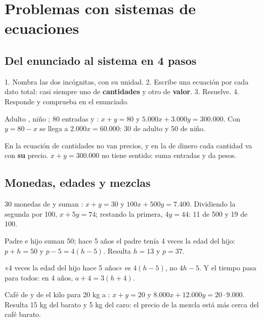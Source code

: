 \section{Problemas con sistemas de ecuaciones}

\subsection{Del enunciado al sistema en 4 pasos}
\begin{clave} 1. Nombra las dos incógnitas, con su unidad. 2. Escribe una ecuación por cada dato total: casi siempre uno de \textbf{cantidades} y otro de \textbf{valor}. 3. Resuelve. 4. Responde y comprueba en el enunciado.\end{clave}
\begin{ejemplo}[Entradas] Adulto , niño ; 80 entradas y : $x + y = 80$ y $5.000x + 3.000y = 300.000$. Con $y = 80 - x$ se llega a $2.000x = 60.000$: 30 de adulto y 50 de niño.\end{ejemplo}
\begin{ojo}[No mezcles] En la ecuación de cantidades no van precios, y en la de dinero cada cantidad va con \textbf{su} precio. $x + y = 300.000$ no tiene sentido: suma entradas y da pesos.\end{ojo}

\subsection{Monedas, edades y mezclas}
\begin{ejemplo}[Monedas] 30 monedas de  y  suman : $x + y = 30$ y $100x + 500y = 7.400$. Dividiendo la segunda por 100, $x + 5y = 74$; restando la primera, $4y = 44$: 11 de 500 y 19 de 100.\end{ejemplo}
\begin{ejemplo}[Edades] Padre e hijo suman 50; hace 5 años el padre tenía 4 veces la edad del hijo: $p + h = 50$ y $p - 5 = 4(h - 5)$. Resulta $h = 13$ y $p = 37$.\end{ejemplo}
\begin{ojo} «4 veces la edad del hijo hace 5 años» es $4(h - 5)$, no $4h - 5$. Y el tiempo pasa para todos: en 4 años, $a + 4 = 3(h + 4)$.\end{ojo}
\begin{ejemplo}[Mezclas] Café de  y de  el kilo para 20 kg a : $x + y = 20$ y $8.000x + 12.000y = 20\cdot 9.000$. Resulta 15 kg del barato y 5 kg del caro: el precio de la mezcla está más cerca del café barato.\end{ejemplo}

